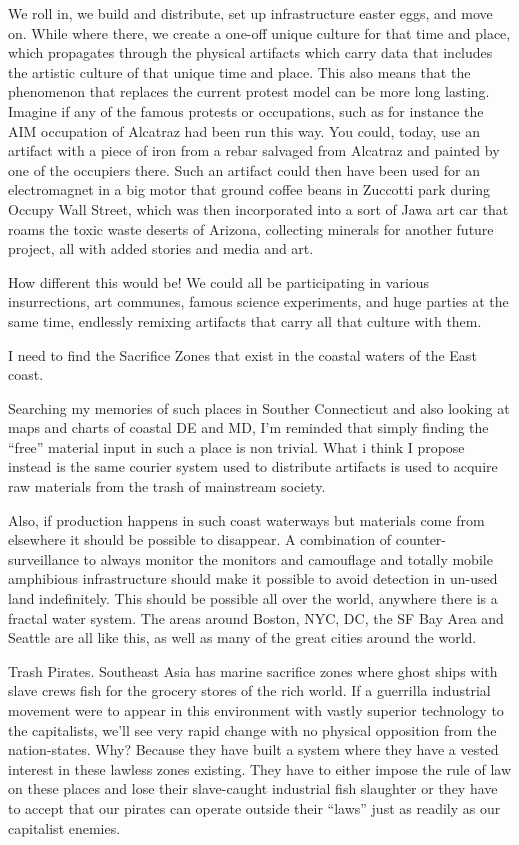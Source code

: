 We roll in, we build and distribute, set up infrastructure easter eggs,
and move on. While where there, we create a one-off unique culture for
that time and place, which propagates through the physical artifacts
which carry data that includes the artistic culture of that unique time
and place. This also means that the phenomenon that replaces the current
protest model can be more long lasting. Imagine if any of the famous
protests or occupations, such as for instance the AIM occupation of
Alcatraz had been run this way. You could, today, use an artifact with a
piece of iron from a rebar salvaged from Alcatraz and painted by one of
the occupiers there. Such an artifact could then have been used for an
electromagnet in a big motor that ground coffee beans in Zuccotti park
during Occupy Wall Street, which was then incorporated into a sort of
Jawa art car that roams the toxic waste deserts of Arizona, collecting
minerals for another future project, all with added stories and media
and art.

How different this would be! We could all be participating in various
insurrections, art communes, famous science experiments, and huge
parties at the same time, endlessly remixing artifacts that carry all
that culture with them.

I need to find the Sacrifice Zones that exist in the coastal waters of
the East coast.

Searching my memories of such places in Souther Connecticut and also
looking at maps and charts of coastal DE and MD, I'm reminded that
simply finding the ``free'' material input in such a place is non
trivial. What i think I propose instead is the same courier system used
to distribute artifacts is used to acquire raw materials from the trash
of mainstream society.

Also, if production happens in such coast waterways but materials come
from elsewhere it should be possible to disappear. A combination of
counter-surveillance to always monitor the monitors and camouflage and
totally mobile amphibious infrastructure should make it possible to
avoid detection in un-used land indefinitely. This should be possible
all over the world, anywhere there is a fractal water system. The areas
around Boston, NYC, DC, the SF Bay Area and Seattle are all like this,
as well as many of the great cities around the world.

Trash Pirates. Southeast Asia has marine sacrifice zones where ghost
ships with slave crews fish for the grocery stores of the rich world. If
a guerrilla industrial movement were to appear in this environment with
vastly superior technology to the capitalists, we'll see very rapid
change with no physical opposition from the nation-states. Why? Because
they have built a system where they have a vested interest in these
lawless zones existing. They have to either impose the rule of law on
these places and lose their slave-caught industrial fish slaughter or
they have to accept that our pirates can operate outside their ``laws''
just as readily as our capitalist enemies.

